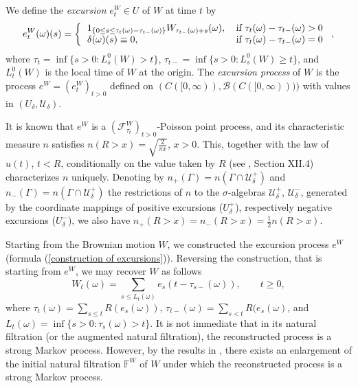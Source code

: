 \documentclass[reqno]{amsart}
\theoremstyle{definition}
\theoremstyle{remark}
\numberwithin{equation}{section}
\begin{document}
We define the  \emph{excursion} $e^W_t\in U$ of $W$ at time $t$ by
\begin{equation}\label{construction of excursions}
e_t^W(\omega)(s) = \left\{
\begin{tabular}{ll}
$1_{\{0\le s \le \tau_t(\omega)-\tau_{t-}(\omega)\}} W_{\tau_{t-}(\omega)+s}(\omega),$ & if $\tau_t(\omega)-\tau_{t-}(\omega)>0$ \\
$\delta(\omega)(s)\equiv 0,$ & if $\tau_t(\omega)-\tau_{t-}(\omega)=0$\end{tabular}\right.,
\end{equation}
where $\tau_t=\inf\{s>0: L_s^0(W)>t\}$, $\tau_{t-}=\inf\{s>0: L_s^0(W)\ge t\}$, and $L_t^0(W)$ is the local time of $W$ at the origin. The \emph{excursion process} of $W$ is the process $e^W=(e^W_t)_{t>0}$ defined on $(C([0,\infty)),\mathcal{B}(C([0,\infty))))$ with values in $(U_\delta,\mathcal{U}_\delta)$.

It is known that $e^W$ is a $(\mathcal{F}^W_{\tau_t})_{t>0}$-Poisson point process, and its characteristic measure $n$ satisfies $n(R>x)=\sqrt{\frac{2}{\pi x}}$, $x>0$. This, together with the law of $u(t)$, $t<R$, conditionally on the value taken by $R$ (see \cite{Revuz and Yor}, Section XII.4) characterizes $n$ uniquely. Denoting by $n_+(\Gamma)=n(\Gamma\cap \mathcal{U}_\delta^+)$ and $n_-(\Gamma)=n(\Gamma\cap \mathcal{U}_\delta^+)$ the restrictions of $n$ to the $\sigma$-algebras $\mathcal{U}_\delta^+$, $\mathcal{U}_\delta^-$, generated by the coordinate mappings of positive excursions ($U_\delta^+$), respectively negative excursions ($U_\delta^-$), we also have $n_+(R>x)=n_-(R>x)=\frac12 n(R>x)$.

Starting from the Brownian motion $W$, we constructed the excursion process $e^W$ (formula (\ref{construction of excursions})). Reversing the construction, that is starting from $e^W$, we may recover $W$ as follows
\begin{equation}\label{construction of process from excursions}
W_t(\omega)=\sum_{s\le L_t(\omega)} e_s(t-\tau_{s-}(\omega)),\qquad t\ge 0,
\end{equation}
where $\tau_t(\omega)=\sum_{s\le t} R(e_s(\omega))$, $\tau_{t-}(\omega)=\sum_{s<t}R(e_s(\omega)$, and $L_t(\omega)=\inf\{s>0: \tau_s(\omega)>t\}$. It is not immediate that in its natural filtration (or the augmented natural filtration), the reconstructed process is a strong Markov process. However, by the results in \cite{Salisbury1}, there exists an enlargement of the initial natural filtration $\mathbb{F}^W$ of $W$ under which the reconstructed process is a strong Markov process.
\end{document}
